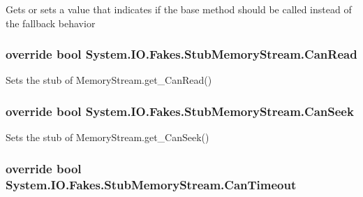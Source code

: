 Gets or sets a value that indicates if the base method should be called instead of the fallback behavior

\hypertarget{class_system_1_1_i_o_1_1_fakes_1_1_stub_memory_stream_a7621a80c79a0e9a419703fd5555a5b5f}{
\subsubsection[{Can\-Read}]{\setlength{\rightskip}{0pt plus 5cm}override bool System.\-I\-O.\-Fakes.\-Stub\-Memory\-Stream.\-Can\-Read\hspace{0.3cm}{\ttfamily [get]}}}\label{class_system_1_1_i_o_1_1_fakes_1_1_stub_memory_stream_a7621a80c79a0e9a419703fd5555a5b5f}


Sets the stub of Memory\-Stream.\-get\-\_\-\-Can\-Read()

\hypertarget{class_system_1_1_i_o_1_1_fakes_1_1_stub_memory_stream_a129f8c62a74603f286609eb4d830c6f5}{
\subsubsection[{Can\-Seek}]{\setlength{\rightskip}{0pt plus 5cm}override bool System.\-I\-O.\-Fakes.\-Stub\-Memory\-Stream.\-Can\-Seek\hspace{0.3cm}{\ttfamily [get]}}}\label{class_system_1_1_i_o_1_1_fakes_1_1_stub_memory_stream_a129f8c62a74603f286609eb4d830c6f5}


Sets the stub of Memory\-Stream.\-get\-\_\-\-Can\-Seek()

\hypertarget{class_system_1_1_i_o_1_1_fakes_1_1_stub_memory_stream_a1bbf4edb0ea3c05e7897561c71edb832}{
\subsubsection[{Can\-Timeout}]{\setlength{\rightskip}{0pt plus 5cm}override bool System.\-I\-O.\-Fakes.\-Stub\-Memory\-Stream.\-Can\-Timeout\hspace{0.3cm}{\ttfamily [get]}}}\label{class_system_1_1_i_o_1_1_fakes_1_1_stub_memory_stream_a1bbf4edb0ea3c05e7897561c71edb832}


